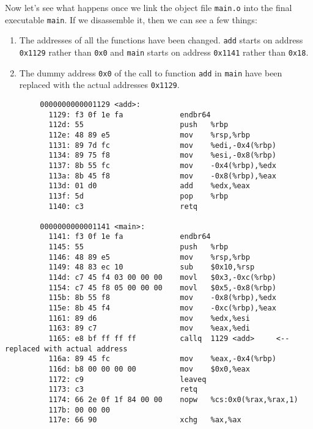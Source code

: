       Now let's see what happens once we link the object file \texttt{main.o} into the final executable \texttt{main}. If we disassemble it, then we can see a few things: 
      \begin{enumerate}
        \item The addresses of all the functions have been changed. \texttt{add} starts on address \texttt{0x1129} rather than \texttt{0x0} and \texttt{main} starts on address \texttt{0x1141} rather than \texttt{0x18}. 
        \item The dummy address \texttt{0x0} of the call to function \texttt{add} in \texttt{main} have been replaced with the actual addresses \texttt{0x1129}. 
      \end{enumerate}

      \begin{lstlisting}
        0000000000001129 <add>:
          1129:	f3 0f 1e fa          	endbr64 
          112d:	55                   	push   %rbp
          112e:	48 89 e5             	mov    %rsp,%rbp
          1131:	89 7d fc             	mov    %edi,-0x4(%rbp)
          1134:	89 75 f8             	mov    %esi,-0x8(%rbp)
          1137:	8b 55 fc             	mov    -0x4(%rbp),%edx
          113a:	8b 45 f8             	mov    -0x8(%rbp),%eax
          113d:	01 d0                	add    %edx,%eax
          113f:	5d                   	pop    %rbp
          1140:	c3                   	retq   

        0000000000001141 <main>:
          1141:	f3 0f 1e fa          	endbr64 
          1145:	55                   	push   %rbp
          1146:	48 89 e5             	mov    %rsp,%rbp
          1149:	48 83 ec 10          	sub    $0x10,%rsp
          114d:	c7 45 f4 03 00 00 00 	movl   $0x3,-0xc(%rbp)
          1154:	c7 45 f8 05 00 00 00 	movl   $0x5,-0x8(%rbp)
          115b:	8b 55 f8             	mov    -0x8(%rbp),%edx
          115e:	8b 45 f4             	mov    -0xc(%rbp),%eax
          1161:	89 d6                	mov    %edx,%esi
          1163:	89 c7                	mov    %eax,%edi
          1165:	e8 bf ff ff ff       	callq  1129 <add>     <-- replaced with actual address
          116a:	89 45 fc             	mov    %eax,-0x4(%rbp)
          116d:	b8 00 00 00 00       	mov    $0x0,%eax
          1172:	c9                   	leaveq 
          1173:	c3                   	retq   
          1174:	66 2e 0f 1f 84 00 00 	nopw   %cs:0x0(%rax,%rax,1)
          117b:	00 00 00 
          117e:	66 90                	xchg   %ax,%ax 
      \end{lstlisting}

